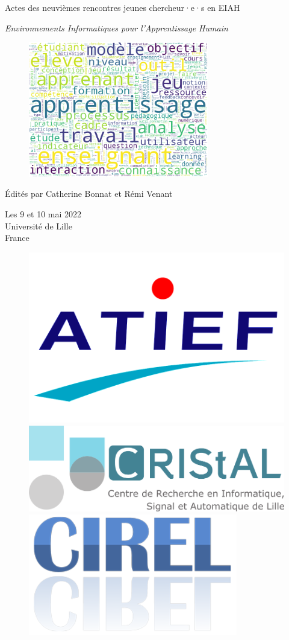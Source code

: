\thispagestyle{empty}

\logoConf[0.7]
\vspace*{2em}
\begin{center}
	\Huge{Actes des neuvièmes rencontres jeunes chercheur·e·s en EIAH}
	\vspace{0.4em}
	
	\Large{\textit{Environnements Informatiques pour l'Apprentissage Humain}}
\end{center}

\begin{figure}[!ht]
	\centering
		\includegraphics[width=0.7\textwidth]{Content/figures/wordcloud.png}
\end{figure}

\begin{center}
	\begin{Large}
		Édités par Catherine Bonnat et Rémi Venant
	\end{Large}

	\begin{large}
		Les 9 et 10 mai 2022\\
		Université de Lille\\
		France
	\end{large}
\end{center}

\vspace*{\fill}

\begin{figure}[!ht]
	\centering
	\includegraphics[width=.15\textwidth,valign=m]{Content/figures/atief.png}\hfill
	\includegraphics[width=.15\textwidth,valign=m]{Content/figures/cristal.png}\hfill
	\includegraphics[width=.15\textwidth,valign=m]{Content/figures/cirel.png}\hfill
\end{figure}

